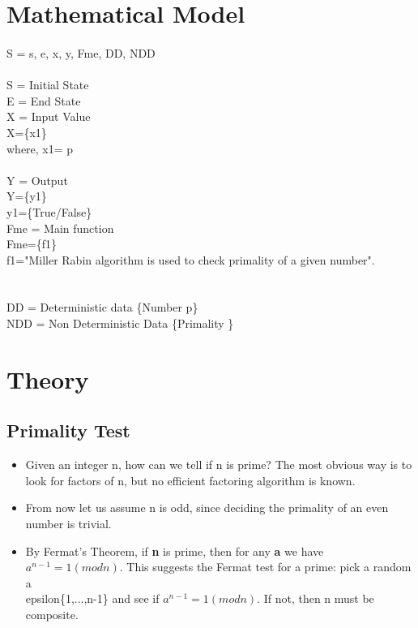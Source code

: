 \documentclass[a4paper,12pt]{article}
\begin{document}
\section{Mathematical Model}
\paragraph{} 
S 	= {s, e, x, y, Fme, DD, NDD}  											\\\\
S   =   Initial State  														\\
E 	=   End State  															\\
X	= Input Value															\\
X=\{x1\} 																\\
where,  x1= p 												\\
 																\\
Y	= Output																\\
Y=\{y1\}																	\\
y1=\{True/False\}									\\
Fme 	= 	Main function 													\\
Fme=\{f1\}\\f1="Miller Rabin algorithm is used to check primality of a given number".		\\
													\\											\\
DD 	= 	Deterministic data \{Number p\}					\\
NDD	= 	Non Deterministic Data \{Primality \}							\\
		
		
	
\section{Theory}
		\paragraph{} 
	\subsection{Primality Test}
		    

	\begin{itemize}
	    \item Given an integer n, how can we tell if n is prime? The most obvious way is to look for factors of n, but no efficient factoring algorithm is known.
	    \item From now let us assume n is odd, since deciding the primality of an even number is trivial.
	    \item By Fermat’s Theorem, if \textbf{n} is prime, then for any \textbf{a} we have $a^{n-1}=1(mod n)$. This suggests the Fermat test for a prime: pick a random a\\epsilon\{1,...,n-1\} and see if  $a^{n-1}=1(mod n)$. If not, then n must be composite.
	    
	    
	  
	\end{itemize}
	
\end{document}
